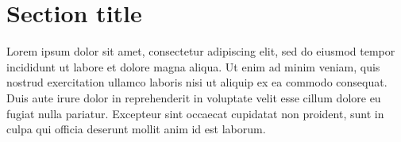 \documentclass[final,nopreprintline]{elsarticle}
\begin{document}
\section{Section title}
\label{sec:sample2}

Lorem ipsum dolor sit amet, consectetur adipiscing elit, sed do eiusmod tempor incididunt ut labore et dolore magna aliqua. Ut enim ad minim veniam, quis nostrud exercitation ullamco laboris nisi ut aliquip ex ea commodo consequat. Duis aute irure dolor in reprehenderit in voluptate velit esse cillum dolore eu fugiat nulla pariatur. Excepteur sint occaecat cupidatat non proident, sunt in culpa qui officia deserunt mollit anim id est laborum.





 

\end{document}
